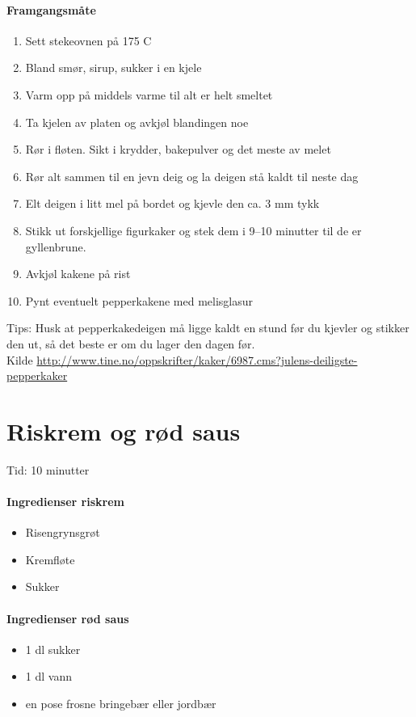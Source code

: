 \documentclass[12pt,a4paper]{book}
\begin{document}
\paragraph{Framgangsmåte}
\begin{enumerate}[noitemsep]
	\item Sett stekeovnen på 175 \degree C
	\item Bland smør, sirup, sukker i en kjele
	\item Varm opp på middels varme til alt er helt smeltet
	\item Ta kjelen av platen og avkjøl blandingen noe
	\item Rør i fløten. Sikt i krydder, bakepulver og det meste av melet
	\item Rør alt sammen til en jevn deig og la deigen stå kaldt til neste dag
	\item Elt deigen i litt mel på bordet og kjevle den ca. 3 mm tykk
	\item Stikk ut forskjellige figurkaker og stek dem i 9--10 minutter til de er gyllenbrune.
	\item Avkjøl kakene på rist
	\item Pynt eventuelt pepperkakene med melisglasur
\end{enumerate}



Tips: Husk at pepperkakedeigen må ligge kaldt en stund før du kjevler og stikker den ut, så det beste er om du lager den dagen før.\\

Kilde \url{http://www.tine.no/oppskrifter/kaker/6987.cms?julens-deiligste-pepperkaker}
\clearpage{}
\clearpage{}\section{﻿Riskrem og rød saus}
\label{riskrem}

Tid: 10 minutter

\paragraph{Ingredienser riskrem}
\begin{itemize}[noitemsep]
	\item Risengrynsgrøt
	\item Kremfløte
	\item Sukker
\end{itemize}

\paragraph{Ingredienser rød saus}
\begin{itemize}[noitemsep]
	\item 1 dl sukker
	\item 1 dl vann
	\item en pose frosne bringebær eller jordbær
\end{itemize}
\end{document}
